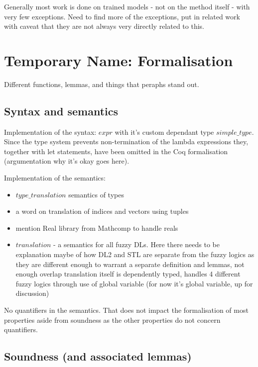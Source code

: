 \documentclass[]{article}
\begin{document}
 Generally most work is done on trained models - not on the method itself - with very few exceptions. Need to find more of the exceptions, put in related work with caveat that they are not always very directly related to this.


\section{Temporary Name: Formalisation}


Different functions, lemmas, and things that peraphs stand out.

\subsection{Syntax and semantics}

Implementation of the syntax: $expr$ with it's custom dependant type $simple\_type$. Since the type system prevents non-termination of the lambda expressions they, together with let statements, have been omitted in the Coq formalisation (argumentation why it's okay goes here).



Implementation of the semantics: 
\begin{itemize}
	\item $type\_translation$ semantics of types
	\item a word on translation of indices and vectors using tuples
	\item mention Real library from Mathcomp to handle reals
	\item $translation$ - a semantics for all fuzzy DLs. Here there needs to be explanation maybe of how DL2 and STL are separate from the fuzzy logics as they are different enough to warrant a separate definition and lemmas, not enough overlap
	translation itself is dependently typed, handles 4 different fuzzy logics through use of global variable (for now it's global variable, up for discussion)
	
\end{itemize}

No quantifiers in the semantics. That does not impact the formalisation of most properties aside from soundness as the other properties do not concern quantifiers.

\subsection{Soundness (and associated lemmas)}
\end{document}
